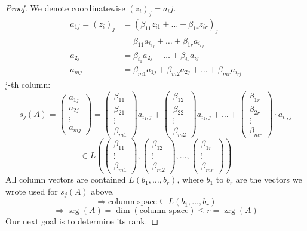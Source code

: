 \documentclass[a4paper,landscape,twocolumn]{article}
\begin{document}
\begin{proof}
  We denote coordinatewise $(z_i)_j = a_ij$.
  \begin{align*}
    a_{1j} = (z_i)_{j}
      &= (\beta_{11} z_{i 1} + \ldots + \beta_{1r} z_{i r})_j \\
      &= \beta_{11} a_{i_{1j}} + \ldots + \beta_{1r} a_{i_{rj}} \\
    a_{2j} &= \beta_{i_1} a_{2j} + \ldots + \beta_{i_r} a_{ij} \\
    a_{mj} &= \beta_{m1} a_{1j} + \beta_{m2} a_{2j} + \ldots + \beta_{mr} a_{i_{rj}}
  \end{align*}
  j-th column:
  \[
    s_j(A)
      = \begin{pmatrix} a_{1j} \\ a_{2j} \\ \vdots \\ a_{mj} \end{pmatrix}
      = \begin{pmatrix} \beta_{11} \\ \beta_{21} \\ \vdots \\ \beta_{m1} \end{pmatrix}
      a_{i_1,j} +
      \begin{pmatrix} \beta_{12} \\ \beta_{22} \\ \vdots \\ \beta_{m2} \end{pmatrix}
      a_{i_2,j} + \ldots +
      \begin{pmatrix} \beta_{1r} \\ \beta_{2r} \\ \vdots \\ \beta_{mr} \end{pmatrix}
      \cdot a_{i_r,j}
  \]
  \[
    \in L\left(
      \begin{pmatrix} \beta_{11} \\ \vdots \\ \beta_{m1} \end{pmatrix},
      \begin{pmatrix} \beta_{12} \\ \vdots \\ \beta_{m2} \end{pmatrix},
      \ldots,
      \begin{pmatrix} \beta_{1r} \\ \vdots \\ \beta_{mr} \end{pmatrix}
    \right)
  \]
  All column vectors are contained $L(b_1, \ldots, b_r)$, where $b_1$ to $b_r$
  are the vectors we wrote used for $s_j(A)$ above.
  \[ \Rightarrow \text{column space} \subseteq L(b_1, \ldots, b_r) \]
  \[ \Rightarrow \operatorname{srg}(A) = \dim{(\text{column space})} \leq r = \operatorname{zrg}(A) \]
  Our next goal is to determine its rank.


\end{proof}
\end{document}
